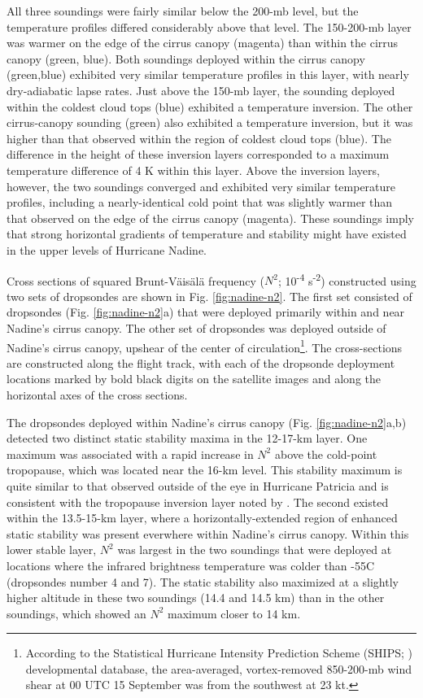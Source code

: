 All three soundings were fairly similar below the 200-mb level, but the temperature profiles differed considerably above that level.
The 150-200-mb layer was warmer on the edge of the cirrus canopy (magenta) than within the cirrus canopy (green, blue).
Both soundings deployed within the cirrus canopy (green,blue) exhibited very similar temperature profiles in this layer, with nearly dry-adiabatic lapse rates.
Just above the 150-mb layer, the sounding deployed within the coldest cloud tops (blue) exhibited a temperature inversion.
The other cirrus-canopy sounding (green) also exhibited a temperature inversion, but it was higher than that observed within the region of coldest cloud tops (blue).
The difference in the height of these inversion layers corresponded to a maximum temperature difference of 4 K within this layer.
Above the inversion layers, however, the two soundings converged and exhibited very similar temperature profiles, including a nearly-identical cold point that was slightly warmer than that observed on the edge of the cirrus canopy (magenta).
These soundings imply that strong horizontal gradients of temperature and stability might have existed in the upper levels of Hurricane Nadine.

Cross sections of squared Brunt-V{\"a}is{\"a}l{\"a} frequency ($N^2$; 10\textsuperscript{-4} s\textsuperscript{-2}) constructed using two sets of dropsondes are shown in Fig. \ref{fig:nadine-n2}.
The first set consisted of dropsondes (Fig. \ref{fig:nadine-n2}a) that were deployed primarily within and near Nadine's cirrus canopy.
The other set of dropsondes was deployed outside of Nadine's cirrus canopy, upshear of the center of circulation\footnote{According to the Statistical Hurricane Intensity Prediction Scheme (SHIPS; \citeauthor{DeMariaetal2005} \citeyear{DeMariaetal2005}) developmental database, the area-averaged, vortex-removed 850-200-mb wind shear at 00 UTC 15 September was from the southwest at 23 kt.}.
The cross-sections are constructed along the flight track, with each of the dropsonde deployment locations marked by bold black digits on the satellite images and along the horizontal axes of the cross sections.

The dropsondes deployed within Nadine's cirrus canopy (Fig. \ref{fig:nadine-n2}a,b) detected two distinct static stability maxima in the 12-17-km layer.
One maximum was associated with a rapid increase in $N^2$ above the cold-point tropopause, which was located near the 16-km level.
This stability maximum is quite similar to that observed outside of the eye in Hurricane Patricia \citep{DuranMolinari2018} and is consistent with the tropopause inversion layer noted by \cite{Wirth2003}.
The second existed within the 13.5-15-km layer, where a horizontally-extended region of enhanced static stability was present everwhere within Nadine's cirrus canopy.
Within this lower stable layer, $N^2$ was largest in the two soundings that were deployed at locations where the infrared brightness temperature was colder than -55\textdegree{}C (dropsondes number 4 and 7).
The static stability also maximized at a slightly higher altitude in these two soundings (14.4 and 14.5 km) than in the other soundings, which showed an $N^2$ maximum closer to 14 km.

